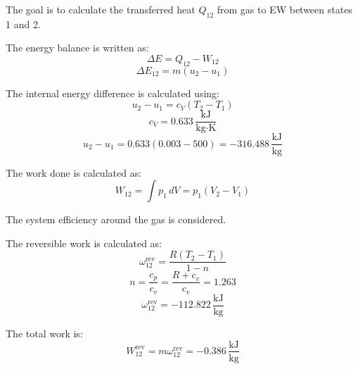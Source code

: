 The goal is to calculate the transferred heat \( Q_{12} \) from gas to EW between states 1 and 2.  

The energy balance is written as:  
\[
\Delta E = Q_{12} - W_{12}
\]  
\[
\Delta E_{12} = m (u_2 - u_1)
\]  

The internal energy difference is calculated using:  
\[
u_2 - u_1 = c_V (T_2 - T_1)
\]  
\[
c_V = 0.633 \, \frac{\text{kJ}}{\text{kg·K}}
\]  
\[
u_2 - u_1 = 0.633 (0.003 - 500) = -316.488 \, \frac{\text{kJ}}{\text{kg}}
\]  

The work done is calculated as:  
\[
W_{12} = \int p_{1} \, dV = p_{1} (V_2 - V_1)
\]  

The system efficiency around the gas is considered.  

The reversible work is calculated as:  
\[
\omega_{12}^{\text{rev}} = \frac{R (T_2 - T_1)}{1 - n}
\]  
\[
n = \frac{c_p}{c_v} = \frac{R + c_v}{c_v} = 1.263
\]  
\[
\omega_{12}^{\text{rev}} = -112.822 \, \frac{\text{kJ}}{\text{kg}}
\]  

The total work is:  
\[
W_{12}^{\text{rev}} = m \omega_{12}^{\text{rev}} = -0.386 \, \frac{\text{kJ}}{\text{kg}}
\]